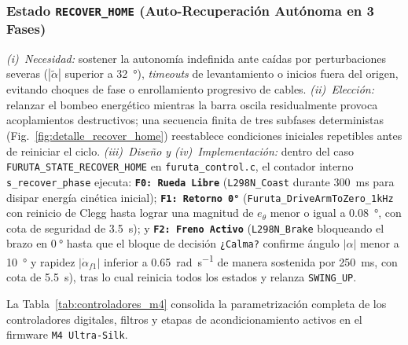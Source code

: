 \subsubsection{Estado \texttt{RECOVER\_HOME} (Auto-Recuperación Autónoma en 3 Fases)}



\textit{(i)~Necesidad:} sostener la autonomía indefinida ante caídas por perturbaciones severas ($|\tilde{\alpha}|$ superior a \qty{32}{\degree}), \textit{timeouts} de levantamiento o inicios fuera del origen, evitando choques de fase o enrollamiento progresivo de cables.
\textit{(ii)~Elección:} relanzar el bombeo energético mientras la barra oscila residualmente provoca acoplamientos destructivos; una secuencia finita de tres subfases deterministas (Fig.~\ref{fig:detalle_recover_home}) reestablece condiciones iniciales repetibles antes de reiniciar el ciclo.
\textit{(iii)~Diseño y (iv)~Implementación:} dentro del caso \texttt{FURUTA\_STATE\_RECOVER\_HOME} en \texttt{furuta\_control.c}, el contador interno \texttt{s\_recover\_phase} ejecuta: \textbf{\texttt{F0: Rueda Libre}} (\texttt{L298N\_Coast} durante \qty{300}{\milli\second} para disipar energía cinética inicial); \textbf{\texttt{F1: Retorno 0°}} (\texttt{Furuta\_DriveArmToZero\_1kHz} con reinicio de Clegg hasta lograr una magnitud de $e_\theta$ menor o igual a \qty{0.08}{\degree}, con cota de seguridad de \qty{3.5}{\second}); y \textbf{\texttt{F2: Freno Activo}} (\texttt{L298N\_Brake} bloqueando el brazo en $\qty{0}{\degree}$ hasta que el bloque de decisión \texttt{¿Calma?} confirme ángulo $|\alpha|$ menor a \qty{10}{\degree} y rapidez $|\dot{\alpha}_{f1}|$ inferior a \qty{0.65}{\radian\per\second} de manera sostenida por \qty{250}{\milli\second}, con cota de \qty{5.5}{\second}), tras lo cual reinicia todos los estados y relanza \texttt{SWING\_UP}.

La Tabla~\ref{tab:controladores_m4} consolida la parametrización completa de los controladores digitales, filtros y etapas de acondicionamiento activos en el firmware \texttt{M4 Ultra-Silk}.


